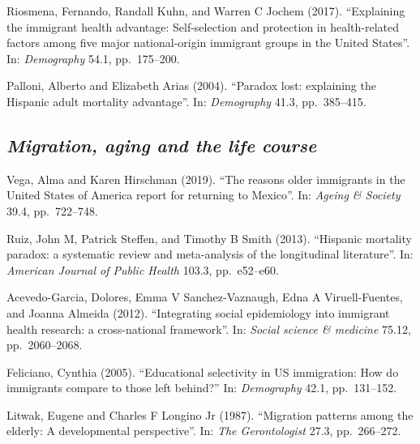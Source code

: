 \documentclass[
  12pt,
]{article}
\begin{document}
Riosmena, Fernando, Randall Kuhn, and Warren C Jochem (2017).
``Explaining the immigrant health advantage: Self-selection and
protection in health-related factors among five major national-origin
immigrant groups in the United States''. In: \emph{Demography} 54.1,
pp.~175--200.

Palloni, Alberto and Elizabeth Arias (2004). ``Paradox lost: explaining
the Hispanic adult mortality advantage''. In: \emph{Demography} 41.3,
pp.~385--415.

\hypertarget{migration-aging-and-the-life-course}{%
\subsection{\texorpdfstring{\emph{Migration, aging and the life
course}}{Migration, aging and the life course}}\label{migration-aging-and-the-life-course}}

Vega, Alma and Karen Hirschman (2019). ``The reasons older immigrants in
the United States of America report for returning to Mexico''. In:
\emph{Ageing \& Society} 39.4, pp.~722--748.

Ruiz, John M, Patrick Steffen, and Timothy B Smith (2013). ``Hispanic
mortality paradox: a systematic review and meta-analysis of the
longitudinal literature''. In: \emph{American Journal of Public Health}
103.3, pp.~e52--e60.

Acevedo-Garcia, Dolores, Emma V Sanchez-Vaznaugh, Edna A
Viruell-Fuentes, and Joanna Almeida (2012). ``Integrating social
epidemiology into immigrant health research: a cross-national
framework''. In: \emph{Social science \& medicine} 75.12,
pp.~2060--2068.

Feliciano, Cynthia (2005). ``Educational selectivity in US immigration:
How do immigrants compare to those left behind?'' In: \emph{Demography}
42.1, pp.~131--152.

Litwak, Eugene and Charles F Longino Jr (1987). ``Migration patterns
among the elderly: A developmental perspective''. In:
\emph{The Gerontologist} 27.3, pp.~266--272.
\end{document}
